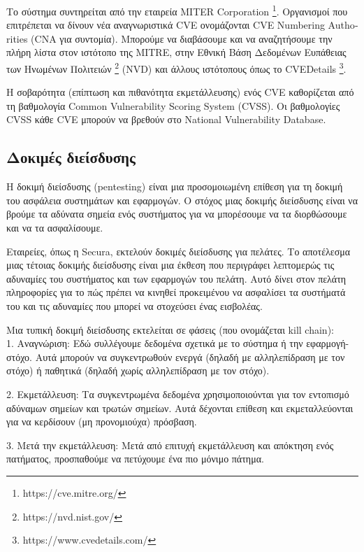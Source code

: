 Το σύστημα συντηρείται από την εταιρεία \textlatin{MITER Corporation}
\footnote{\textlatin{https://cve.mitre.org/}}. Οργανισμοί
που επιτρέπεται να δίνουν νέα αναγνωριστικά \textlatin{CVE} ονομάζονται
\textlatin{CVE Numbering Authorities (CNA} για συντομία). Μπορούμε να
διαβάσουμε και να αναζητήσουμε την πλήρη λίστα στον ιστότοπο της
\textlatin{MITRE}, στην Εθνική Βάση Δεδομένων Ευπάθειας των Ηνωμένων Πολιτειών
\footnote{\textlatin{https://nvd.nist.gov/}} \textlatin{(NVD)} και άλλους
ιστότοπους όπως το \textlatin{CVEDetails}
\footnote{\textlatin{https://www.cvedetails.com/}}.

Η σοβαρότητα (επίπτωση και πιθανότητα εκμετάλλευσης) ενός \textlatin{CVE}
καθορίζεται από τη βαθμολογία \textlatin{Common Vulnerability Scoring System
(CVSS}). Οι βαθμολογίες \textlatin{CVSS} κάθε \textlatin{CVE} μπορούν να
βρεθούν στο \textlatin{National Vulnerability Database}.


\subsection{Δοκιμές διείσδυσης}

Η δοκιμή διείσδυσης (\textlatin{pentesting}) είναι μια προσομοιωμένη επίθεση
για τη δοκιμή του ασφάλεια συστημάτων και εφαρμογών. Ο στόχος μιας δοκιμής
διείσδυσης είναι να βρούμε τα αδύνατα σημεία ενός συστήματος για να
μπορέσουμε να τα διορθώσουμε και να τα ασφαλίσουμε.

Εταιρείες, όπως η \textlatin{Secura}, εκτελούν δοκιμές διείσδυσης για πελάτες.
Το αποτέλεσμα μιας τέτοιας δοκιμής διείσδυσης είναι μια έκθεση που περιγράφει
λεπτομερώς τις αδυναμίες του συστήματος και των εφαρμογών του πελάτη. Αυτό
δίνει στον πελάτη πληροφορίες για το πώς πρέπει να κινηθεί προκειμένου να
ασφαλίσει τα συστήματά του και τις αδυναμίες που μπορεί να στοχεύσει ένας
εισβολέας. 

Μια τυπική δοκιμή διείσδυσης εκτελείται σε φάσεις (που ονομάζεται
\textlatin{kill chain}): \\

1. Αναγνώριση: Εδώ συλλέγουμε δεδομένα σχετικά με το σύστημα ή την
εφαρμογή-στόχο. Αυτά μπορούν να συγκεντρωθούν ενεργά (δηλαδή με αλληλεπίδραση
με τον στόχο) ή παθητικά (δηλαδή χωρίς αλληλεπίδραση με τον στόχο).

2. Εκμετάλλευση: Τα συγκεντρωμένα δεδομένα χρησιμοποιούνται για τον εντοπισμό
αδύναμων σημείων και τρωτών σημείων. Αυτά δέχονται επίθεση και εκμεταλλεύονται
για να κερδίσουν (μη προνομιούχα) πρόσβαση.

3. Μετά την εκμετάλλευση: Μετά από επιτυχή εκμετάλλευση και απόκτηση ενός
πατήματος, προσπαθούμε να πετύχουμε ένα πιο μόνιμο πάτημα.

